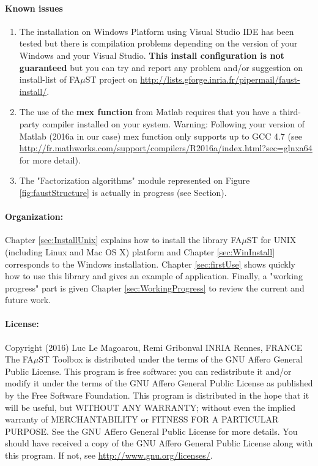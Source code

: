 \paragraph{Known issues}
\begin{enumerate}
\item The installation on Windows Platform using Visual Studio IDE has been tested but there is compilation problems depending on the version of your Windows and your Visual Studio. \textbf{This install configuration is not guaranteed} but you can try and report any problem and/or suggestion on install-list of FA$\mu$ST project on \url{http://lists.gforge.inria.fr/pipermail/faust-install/}. 
 
\item The use of the \textbf{mex function} from Matlab requires that you have a third-party compiler installed on your system. Warning: Following your version of Matlab (2016a in our case) mex function only supports up to GCC 4.7 (see \url{http://fr.mathworks.com/support/compilers/R2016a/index.html?sec=glnxa64} for more detail).

\item The "Factorization algorithms" module represented on Figure \ref{fig:faustStructure} is actually in progress (see Section).

\end{enumerate}


\paragraph{Organization:}Chapter \ref{sec:InstallUnix} explains how to install the library FA$\mu$ST for UNIX (including Linux and Mac OS X) platform  and Chapter \ref{sec:WinInstall} corresponds to the Windows installation. Chapter \ref{sec:firstUse} shows quickly how to use this library and gives an example of application. Finally, a "working progress" part is given Chapter \ref{sec:WorkingProgress} to review the current and future work. 

\paragraph{License:}Copyright (2016) Luc Le Magoarou, Remi Gribonval INRIA Rennes, FRANCE \\
The FA$\mu$ST Toolbox is distributed under the terms of the GNU Affero General Public License. This program is free software: you can redistribute it and/or modify it under the terms of the GNU Affero General Public License as published by the Free Software Foundation. This program is distributed in the hope that it will be useful, but WITHOUT ANY WARRANTY; without even the implied warranty of MERCHANTABILITY or FITNESS FOR A PARTICULAR PURPOSE.  See the GNU Affero General Public License for more details. You should have received a copy of the GNU Affero General Public License along with this program.  If not, see \url{http://www.gnu.org/licenses/}.
